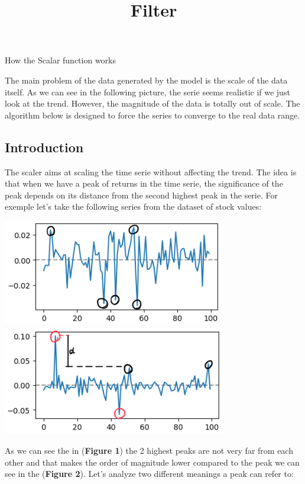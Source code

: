 \documentclass{article}
\title{Filter}
\begin{document}
\begin{center}
    {\huge{How the Scalar function works}}
\end{center}    
    \begin{multicols}{2}
    The main problem of the data generated by the model is the scale of the data itself.
    As we can see in the following picture, the serie seems realistic if we just look at the trend.
    However, the magnitude of the data is totally out of scale. The algorithm below is designed to force
    the series to converge to the real data range.
    \subsection*{Introduction}
    The scaler aims at scaling the time serie without affecting the trend. The idea is that when we have 
    a peak of returns in the time serie, the significance of the peak depends on its distance from the second highest peak in the serie. For exemple let's take the following series from the dataset of stock values:\\
    \begin{center}
        \includegraphics[scale = 0.7]{imgs/small_peaks.png}
        \includegraphics[scale = 0.7]{imgs/big_peaks.png}\\
    \end{center}
    As we can see the in (\textbf{Figure 1}) the 2 highest peaks are not very far from each other and that makes the order of magnitude lower compared to the peak we can see in the (\textbf{Figure 2}). Let's analyze two different meanings a peak can refer to:

\end{multicols}
\end{document}
